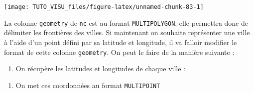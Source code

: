 \documentclass[]{book}
\newenvironment{Shaded}{\begin{snugshade}}{\end{snugshade}}
\newcommand{\KeywordTok}[1]{\textcolor[rgb]{0.13,0.29,0.53}{\textbf{#1}}}
\newcommand{\NormalTok}[1]{#1}
\newcommand{\OperatorTok}[1]{\textcolor[rgb]{0.81,0.36,0.00}{\textbf{#1}}}
\newcommand{\StringTok}[1]{\textcolor[rgb]{0.31,0.60,0.02}{#1}}
\providecommand{\tightlist}{%
  \setlength{\itemsep}{0pt}\setlength{\parskip}{0pt}}
\theoremstyle{definition}
\theoremstyle{definition}
\theoremstyle{definition}
\theoremstyle{remark}
\begin{document}
\begin{center}\texttt{[image: TUTO\_VISU\_files/figure-latex/unnamed-chunk-83-1]} \end{center}

La colonne \texttt{geometry} de \texttt{nc} est au format \texttt{MULTIPOLYGON}, elle permettra donc de délimiter les frontières des villes. Si maintenant on souhaite représenter une ville à l'aide d'un point défini par sa latitude et longitude, il va falloir modifier le format de cette colonne \texttt{geometry}. On peut le faire de la manière suivante :

\begin{enumerate}
\def\labelenumi{\arabic{enumi}.}
\tightlist
\item
  On récupère les latitudes et longitudes de chaque ville :
\end{enumerate}

\begin{Shaded}
\end{Shaded}

\begin{enumerate}
\def\labelenumi{\arabic{enumi}.}
\setcounter{enumi}{1}
\tightlist
\item
  On met ces coordonnées au format \texttt{MULTIPOINT}
\end{enumerate}
\end{document}
